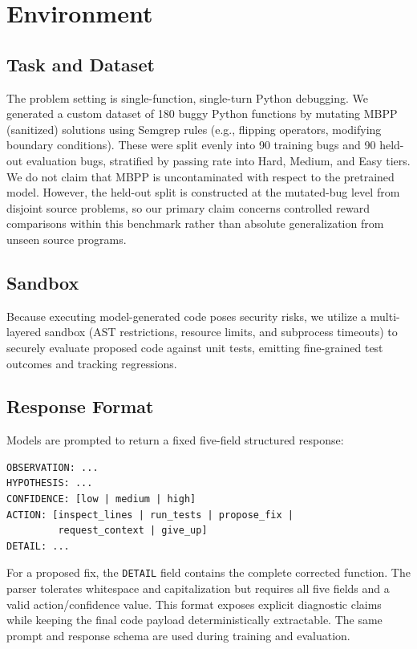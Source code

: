 \documentclass{article}
\begin{document}
\section{Environment}

\subsection{Task and Dataset}
The problem setting is single-function, single-turn Python debugging. We generated a custom dataset of 180 buggy Python functions by mutating MBPP (sanitized) \cite{Austin2021} solutions using Semgrep rules (e.g., flipping operators, modifying boundary conditions). These were split evenly into 90 training bugs and 90 held-out evaluation bugs, stratified by passing rate into Hard, Medium, and Easy tiers. We do not claim that MBPP is uncontaminated with respect to the pretrained model. However, the held-out split is constructed at the mutated-bug level from disjoint source problems, so our primary claim concerns controlled reward comparisons within this benchmark rather than absolute generalization from unseen source programs.

\subsection{Sandbox}
Because executing model-generated code poses security risks, we utilize a multi-layered sandbox (AST restrictions, resource limits, and subprocess timeouts) to securely evaluate proposed code against unit tests, emitting fine-grained test outcomes and tracking regressions.

\subsection{Response Format}
Models are prompted to return a fixed five-field structured response:

\begin{verbatim}
OBSERVATION: ...
HYPOTHESIS: ...
CONFIDENCE: [low | medium | high]
ACTION: [inspect_lines | run_tests | propose_fix |
         request_context | give_up]
DETAIL: ...
\end{verbatim}

For a proposed fix, the \texttt{DETAIL} field contains the complete corrected
function. The parser tolerates whitespace and capitalization but requires all
five fields and a valid action/confidence value. This format exposes explicit
diagnostic claims while keeping the final code payload deterministically
extractable. The same prompt and response schema are used during training and
evaluation.
\end{document}
